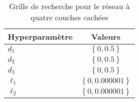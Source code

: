 \begin{table}[h]
\centering
\caption{\label{tab:rechercheDeep4} Grille de recherche pour le réseau à quatre couches cachées}
\begin{tabular}{lc}
\toprule
Hyperparamètre  & Valeurs\\
\midrule
$d_1$ & $\left\{ 0, 0.5 \right\}$\\
$d_2$ & $\left\{ 0, 0.5 \right\}$\\
$d_3$ & $\left\{ 0, 0.5 \right\}$\\
$\ell_1$ & $\left\{0, 0.000001 \right\}$\\
$\ell_2$ & $\left\{0, 0.000001 \right\}$\\
\bottomrule
\end{tabular}
\end{table}